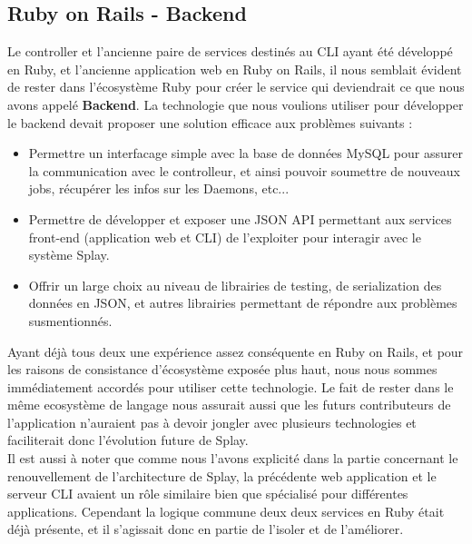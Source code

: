 \documentclass{eplmastersthesis}
\begin{document}
      \subsection{Ruby on Rails - Backend}

        Le controller et l'ancienne paire de services destinés au CLI ayant été
        développé en Ruby, et l'ancienne application web en Ruby on Rails, il
        nous semblait évident de rester dans l'écosystème Ruby pour créer
        le service qui deviendrait ce que nous avons appelé \textbf{Backend}.
        La technologie que nous voulions utiliser pour développer le backend
        devait proposer une solution efficace aux problèmes suivants : \\

        \begin{itemize}
          \item Permettre un interfacage simple avec la base de données MySQL
          pour assurer la communication avec le controlleur, et ainsi pouvoir
          soumettre de nouveaux jobs, récupérer les infos sur les Daemons, etc...
          \item Permettre de développer et exposer une JSON API permettant
          aux services front-end (application web et CLI) de l'exploiter
          pour interagir avec le système Splay.
          \item Offrir un large choix au niveau de librairies de testing,
          de serialization des données en JSON, et autres librairies permettant
          de répondre aux problèmes susmentionnés.
        \end{itemize}

        Ayant déjà tous deux une expérience assez conséquente en Ruby on Rails,
        et pour les raisons de consistance d'écosystème exposée plus haut, nous
        nous sommes immédiatement accordés pour utiliser cette technologie.
        Le fait de rester dans le même ecosystème de langage nous assurait
        aussi que les futurs contributeurs de l'application n'auraient pas
        à devoir jongler avec plusieurs technologies et faciliterait donc
        l'évolution future de Splay.\\
        Il est aussi à noter que comme nous l'avons explicité dans la partie
        concernant le renouvellement de l'architecture de Splay, la précédente
        web application et le serveur CLI avaient un rôle similaire bien que
        spécialisé pour différentes applications. Cependant la logique commune
        deux deux services en Ruby était déjà présente, et il s'agissait donc
        en partie de l'isoler et de l'améliorer.\\
\end{document}
